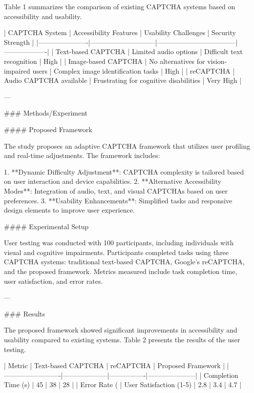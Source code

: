 Table 1 summarizes the comparison of existing CAPTCHA systems based on accessibility and usability.

| CAPTCHA System       | Accessibility Features      | Usability Challenges              | Security Strength |
|----------------------|-----------------------------|-----------------------------------|-------------------|
| Text-based CAPTCHA   | Limited audio options       | Difficult text recognition        | High              |
| Image-based CAPTCHA  | No alternatives for vision-impaired users | Complex image identification tasks | High              |
| reCAPTCHA            | Audio CAPTCHA available     | Frustrating for cognitive disabilities | Very High         |

---

### Methods/Experiment

#### Proposed Framework

The study proposes an adaptive CAPTCHA framework that utilizes user profiling and real-time adjustments. The framework includes:

1. **Dynamic Difficulty Adjustment**: CAPTCHA complexity is tailored based on user interaction and device capabilities.
2. **Alternative Accessibility Modes**: Integration of audio, text, and visual CAPTCHAs based on user preferences.
3. **Usability Enhancements**: Simplified tasks and responsive design elements to improve user experience.

#### Experimental Setup

User testing was conducted with 100 participants, including individuals with visual and cognitive impairments. Participants completed tasks using three CAPTCHA systems: traditional text-based CAPTCHA, Google's reCAPTCHA, and the proposed framework. Metrics measured include task completion time, user satisfaction, and error rates.

---

### Results

The proposed framework showed significant improvements in accessibility and usability compared to existing systems. Table 2 presents the results of the user testing.

| Metric                  | Text-based CAPTCHA | reCAPTCHA      | Proposed Framework |
|-------------------------|--------------------|----------------|---------------------|
| Completion Time (s)     | 45                | 38             | 28                  |
| Error Rate (%
| User Satisfaction (1-5) | 2.8               | 3.4            | 4.7                 |


